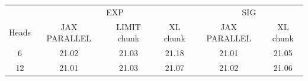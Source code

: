 \begin{tabular}{c|ccc|cc}
    \toprule
          & \multicolumn{3}{c}{EXP} & \multicolumn{2}{c}{SIG}                                      \\
    Heads & JAX PARALLEL            & LIMIT chunk             & XL chunk & JAX PARALLEL & XL chunk \\
    \midrule
    6     & 21.02                   & 21.03                   & 21.18    & 21.01        & 21.05    \\
    12    & 21.01                   & 21.03                   & 21.07    & 21.02        & 21.06    \\
    \bottomrule
\end{tabular}
